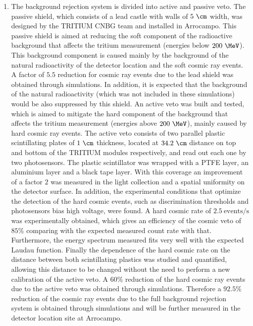 \begin{enumerate}
\begin{enumerate}
\item{} The background rejection system is divided into active and passive veto. The passive shield, which consists of a lead castle with walls of $5~\cm$ width, was designed by the TRITIUM CNBG team and installed in Arrocampo. This passive shield is aimed at reducing the soft component of the radioactive background that affects the tritium measurement (energies below $200~\MeV$). This background component is caused mainly by the background of the natural radioactivity of the detector location and the soft cosmic ray events. A factor of $5.5$ reduction for cosmic ray events due to the lead shield was obtained through simulations. In addition, it is expected that the background of the natural radioactivity (which was not included in these simulations) would be also suppressed by this shield. An active veto was built and tested, which is aimed to mitigate the hard component of the background that affects the tritium measurement (energies above $200~\MeV$), mainly caused by hard cosmic ray events. The active veto consists of two parallel plastic scintillating plates of $1~\cm$ thickness, located at $34.2~\cm$ distance on top and bottom of the TRITIUM modules respectively, and read out each one by two photosensors. The plastic scintillator was wrapped with a PTFE layer, an aluminium layer and a black tape layer. With this coverage an improvement of a factor $2$ was measured in the light collection and a spatial uniformity on the detector surface. In addition, the experimental conditions that optimize the detection of the hard cosmic events, such as discrimination thresholds and photosensors bias high voltage, were found. A hard cosmic rate of $2.5~\text{events}/\text{s}$ was experimentally obtained, which gives an efficiency of the cosmic veto of $85\%$ comparing with the expected measured count rate with that. Furthermore, the energy spectrum measured fits very well with the expected Laudau function. Finally the dependence of the hard cosmic rate on the distance between both scintillating plastics was studied and quantified, allowing this distance to be changed without the need to perform a new calibration of the active veto. A $60\%$ reduction of the hard cosmic ray events due to the active veto was obtained through simulations. Therefore a $92.5\%$ reduction of the cosmic ray events due to the full background rejection system is obtained through simulations and will be further measured in the detector location site at Arrocampo.


\end{enumerate}
\end{enumerate}
